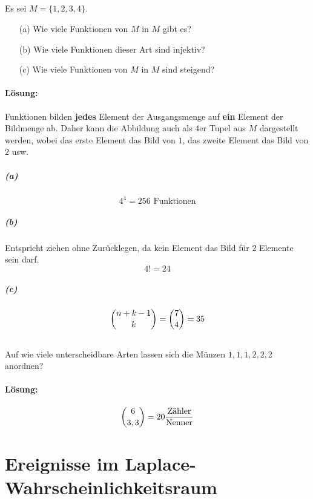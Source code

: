 \documentclass[ngerman]{scrartcl}
\begin{document}
\subsection{}

Es sei $M = \lbrace 1, 2, 3, 4 \rbrace$.
\begin{enumerate}
\item[(a)] Wie viele Funktionen von $M$ in $M$ gibt es?
\item[(b)] Wie viele Funktionen dieser Art sind injektiv?
\item[(c)] Wie viele Funktionen von $M$ in $M$ sind steigend?
\end{enumerate}

\paragraph{Lösung:}
Funktionen bilden \textbf{jedes} Element der Ausgangsmenge auf \textbf{ein} Element der Bildmenge ab. Daher kann die Abbildung auch als 4er Tupel aus $M$ dargestellt werden, wobei das erste Element das Bild von $1$, das zweite Element das Bild von $2$ usw.
\subparagraph{(a)}
\begin{equation*}
4^{4} = 256 \text{ Funktionen}
\end{equation*}
\subparagraph{(b)}
Entspricht ziehen ohne Zurücklegen, da kein Element das Bild für 2 Elemente sein darf.
\[4! = 24\]
\subparagraph{(c)}
\begin{equation*}
\dbinom{n+k-1}{k} = \dbinom{7}{4} = 35
\end{equation*}

\subsection{}

Auf wie viele unterscheidbare Arten lassen sich die Münzen $1, 1, 1, 2, 2, 2$ anordnen?
\paragraph{Lösung:}
\begin{equation*}
	\dbinom{6}{3,3} = 20\dfrac{\text{Zähler}}{\text{Nenner}}
\end{equation*}
\section{Ereignisse im Laplace-Wahrscheinlichkeitsraum}

\subsection{}
\end{document}
